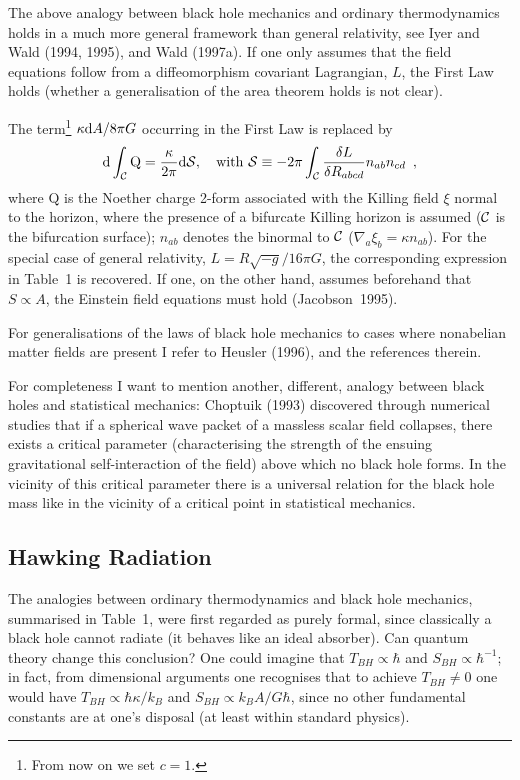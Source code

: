 \documentclass[12pt]{article}
\def\D{{\rm d}}
\newcommand{\be}{\begin{equation}}
\newcommand{\ee}{\end{equation}}
\begin{document}
\vskip 2mm
\normalsize

The above analogy between black hole mechanics and
ordinary thermodynamics holds in a much more general framework
than general relativity,
see Iyer and Wald (1994, 1995), and Wald (1997a).
 If one only assumes that the field
equations follow from a diffeomorphism covariant Lagrangian, $L$,
the First Law holds (whether a generalisation
of the area theorem holds is not clear). 

\vskip 2mm

The term\footnote{From now on we set $c=1$.}
 $\kappa \D A/8\pi G$ occurring in the First Law 
is replaced by
\be \D\int_{\cal C}\mbox{Q}=\frac{\kappa}{2\pi}\D{\cal S}, \quad
    \mbox{with } {\cal S}\equiv -2\pi\int_{\cal C}
     \frac{\delta L}{\delta R_{abcd}}n_{ab}n_{cd} \enspace, \ee
where $\mbox{Q}$ is the Noether charge 2-form associated with the
Killing field $\xi$ normal to the horizon, where the presence
of a bifurcate Killing horizon is assumed (${\cal C}$ is the
bifurcation surface); $n_{ab}$ denotes the binormal to
${\cal C}$ ($\nabla_a\xi_b=\kappa n_{ab}$). For the special case
of general relativity, $L=R\sqrt{-g}/16\pi G$, the corresponding
expression in Table~1 is recovered. If one, on the other hand,
assumes beforehand that $S\propto A$,
the Einstein field equations must hold (Jacobson~1995).

\vskip 2mm
\normalsize

For generalisations of the laws of black hole mechanics to
cases where nonabelian matter fields are present I refer
to Heusler (1996), and the references therein.

For completeness I want to mention another, different, analogy between
black holes and statistical mechanics: 
Choptuik (1993) discovered through numerical studies
 that if a spherical wave packet of a massless
scalar field collapses, there exists a critical parameter
(characterising the strength of the ensuing gravitational
self-interaction of the field)
above which no black hole forms. In the vicinity of this
critical parameter there is a universal relation for
the black hole mass like in the vicinity of a critical point
in statistical mechanics. 

\subsection{Hawking Radiation}

The analogies between ordinary thermodynamics and black hole
mechanics, summarised in Table~1, were first regarded as purely formal,
since classically a black hole cannot radiate
(it behaves like an ideal absorber). Can quantum theory
change this conclusion? One could imagine that $T_{BH}\propto\hbar$
and $S_{BH}\propto\hbar^{-1}$; in fact, from dimensional
arguments one recognises that to achieve $T_{BH}\neq0$ one would
have $T_{BH}\propto \hbar\kappa/k_B$ and $S_{BH}\propto k_BA/G\hbar$,
since no other fundamental constants are at one's disposal
(at least within standard physics). 
\end{document}
